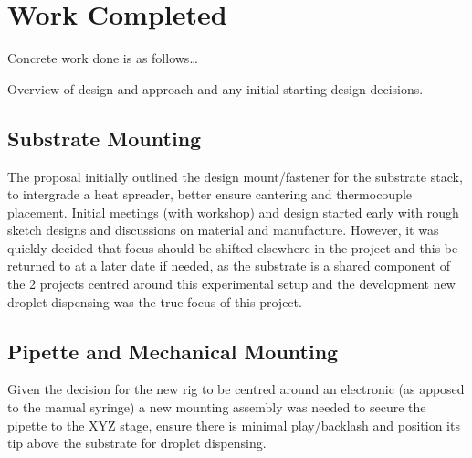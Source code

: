 \chapter{Work Completed}\label{C:work}

Concrete work done is as follows\dots

Overview of design and approach and any initial starting design decisions. 

\section{Substrate Mounting}
The proposal initially outlined the design mount/fastener for the substrate stack, to intergrade a heat spreader, better ensure cantering and thermocouple placement. Initial meetings (with workshop) and design started early with rough sketch designs and discussions on material and manufacture. However, it was quickly decided that focus should be shifted elsewhere in the project and this be returned to at a later date if needed, as the substrate is a shared component of the 2 projects centred around this experimental setup and the development new droplet dispensing was the true focus of this project.

\section{Pipette and Mechanical Mounting}
Given the decision for the new rig to be centred around an electronic (as apposed to the manual syringe) a new mounting assembly was needed to secure the pipette to the XYZ stage, ensure there is minimal play/backlash and position its tip above the substrate for droplet dispensing.

